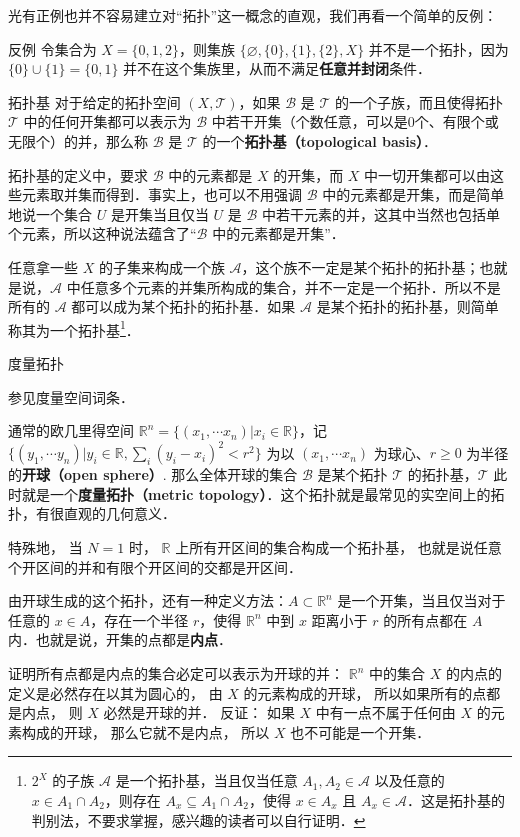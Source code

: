 光有正例也并不容易建立对“拓扑”这一概念的直观，我们再看一个简单的反例：

\begin{example}{反例}
令集合为 $X=\{0, 1, 2\}$，则集族 $\{\varnothing, \{0\},\{1\},\{2\}, X\}$ 并不是一个拓扑，因为 $\{0\}\cup\{1\}=\{0,1\}$ 并不在这个集族里，从而不满足\textbf{任意并封闭}条件．
\end{example}

\begin{definition}{拓扑基}\label{Topol_def2}
对于给定的拓扑空间 $(X, \mathcal{T})$，如果 $\mathcal{B}$ 是 $\mathcal{T}$ 的一个子族，而且使得拓扑 $\mathcal{T}$ 中的任何开集都可以表示为 $\mathcal{B}$ 中若干开集（个数任意，可以是0个、有限个或无限个）的并，那么称 $\mathcal{B}$ 是 $\mathcal{T}$ 的一个\textbf{拓扑基（topological basis）}．
\end{definition}

拓扑基的定义中，要求 $\mathcal{B}$ 中的元素都是 $X$ 的开集，而 $X$ 中一切开集都可以由这些元素取并集而得到．事实上，也可以不用强调
$\mathcal{B}$ 中的元素都是开集，而是简单地说一个集合 $U$ 是开集当且仅当 $U$ 是 $\mathcal{B}$ 中若干元素的并，这其中当然也包括单个元素，所以这种说法蕴含了“$\mathcal{B}$ 中的元素都是开集”．

任意拿一些 $X$ 的子集来构成一个族 $\mathcal{A}$，这个族不一定是某个拓扑的拓扑基；也就是说，$\mathcal{A}$ 中任意多个元素的并集所构成的集合，并不一定是一个拓扑．所以不是所有的 $\mathcal{A}$ 都可以成为某个拓扑的拓扑基．如果 $\mathcal{A}$ 是某个拓扑的拓扑基，则简单称其为一个拓扑基\footnote{$2^X$ 的子族 $\mathcal{A}$ 是一个拓扑基，当且仅当任意 $A_1, A_2\in\mathcal{A}$ 以及任意的 $x\in A_1\cap A_2$，则存在 $A_x\subseteq A_1\cap A_2$，使得 $x\in A_x$ 且 $A_x\in \mathcal{A}$．这是拓扑基的判别法，不要求掌握，感兴趣的读者可以自行证明．}．


\begin{example}{度量拓扑}

参见度量空间词条．

通常的欧几里得空间 $\mathbb{R}^n=\{(x_1, \cdots x_n)|x_i\in \mathbb{R}\}$，记 $\{(y_1, \cdots y_n)|y_i\in \mathbb{R}, \sum_i(y_i-x_i)^2< r^2\}$ 为以 $(x_1, \cdots x_n)$ 为球心、$r\geqslant 0$ 为半径的\textbf{开球（open sphere）}. 那么全体开球的集合 $\mathcal{B}$ 是某个拓扑 $\mathcal{T}$ 的拓扑基，$\mathcal{T}$ 此时就是一个\textbf{度量拓扑（metric topology）}．这个拓扑就是最常见的实空间上的拓扑，有很直观的几何意义．

特殊地， 当 $N = 1$ 时， $\mathbb R$ 上所有开区间的集合构成一个拓扑基， 也就是说任意个开区间的并和有限个开区间的交都是开区间．

由开球生成的这个拓扑，还有一种定义方法：$A\subset \mathbb{R}^n$ 是一个开集，当且仅当对于任意的 $x\in A$，存在一个半径 $r$，使得 $\mathbb R^n$ 中到 $x$ 距离小于 $r$ 的所有点都在 $A$ 内．也就是说，开集的点都是\textbf{内点}．

证明所有点都是内点的集合必定可以表示为开球的并： $\mathbb R^n$ 中的集合 $X$ 的内点的定义是必然存在以其为圆心的， 由 $X$ 的元素构成的开球， 所以如果所有的点都是内点， 则 $X$ 必然是开球的并． 反证： 如果 $X$ 中有一点不属于任何由 $X$ 的元素构成的开球， 那么它就不是内点， 所以 $X$ 也不可能是一个开集．
\end{example}

